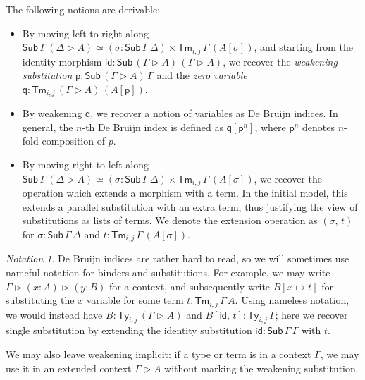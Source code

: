 \documentclass[acmsmall,review]{acmart}
\newcommand{\msf}[1]{\mathsf{#1}}
\newcommand{\ext}{\triangleright}
\newcommand{\Sub}{\msf{Sub}}
\newcommand{\Ty}{\msf{Ty}}
\newcommand{\Tm}{\msf{Tm}}
\newcommand{\p}{\mathsf{p}}
\newcommand{\q}{\mathsf{q}}
\newcommand{\id}{\msf{id}}
\theoremstyle{remark}
\newtheorem{notation}{Notation}
\begin{document}

The following notions are derivable:
\begin{itemize}
\item
  By moving left-to-right along $\Sub\,\Gamma\,(\Delta\ext A) \simeq (\sigma :
  \Sub\,\Gamma\,\Delta) \times \Tm_{i,j}\,\Gamma\,(A[\sigma])$,
  and starting from the identity morphism $\id : \Sub\,(\Gamma\ext A)\,(\Gamma\ext A)$, we recover
  the \emph{weakening substitution} $\p : \Sub\,(\Gamma\ext A)\,\Gamma$ and the \emph{zero variable}
  $\q : \Tm_{i,j}\,(\Gamma\ext A)\,(A[\p])$.
\item
  By weakening $\q$, we recover a notion of variables as De Bruijn
  indices. In general, the $n$-th De Bruijn index is defined as $\q[\p^{n}]$,
  where $\p^{n}$ denotes $n$-fold composition of $p$.
\item
  By moving right-to-left along $\Sub\,\Gamma\,(\Delta\ext A) \simeq (\sigma :
  \Sub\,\Gamma\,\Delta) \times \Tm_{i,j}\,\Gamma\,(A[\sigma])$, we recover the
  operation which extends a morphism with a term. In the initial model, this
  extends a parallel substitution with an extra term, thus justifying the view
  of substitutions as lists of terms. We denote the extension operation as
  $(\sigma,\,t)$ for $\sigma : \Sub\,\Gamma\,\Delta$ and $t : \Tm_{i,j}\,\Gamma\,(A[\sigma])$.
\end{itemize}

\begin{notation}
De Bruijn indices are rather hard to read, so we will sometimes use nameful notation
for binders and substitutions. For example, we may write $\Gamma \ext (x : A)
\ext (y : B)$ for a context, and subsequently write $B[x \mapsto t]$ for
substituting the $x$ variable for some term $t : \Tm_{i,j}\,\Gamma\,A$. Using
nameless notation, we would instead have $B : \Ty_{i,j}\,(\Gamma \ext A)$ and
$B[\id,\,t] : \Ty_{i,j}\,\Gamma$; here we recover single substitution by extending the identity
substitution $\id : \Sub\,\Gamma\,\Gamma$ with $t$.

We may also leave weakening implicit: if a type or term is in a context
$\Gamma$, we may use it in an extended context $\Gamma \ext A$ without marking
the weakening substitution.
\end{notation}
\end{document}
